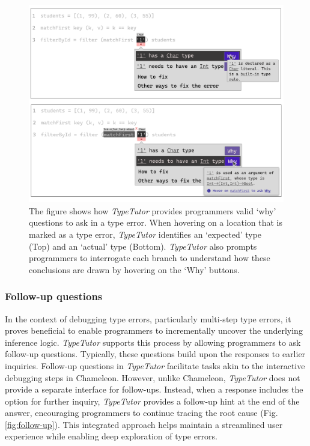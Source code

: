 \begin{figure}[hbt]
  \includegraphics[width=\linewidth]{Why}
  \caption{
      \label{fig:why}
      The figure shows how \textit{TypeTutor} provides programmers valid `why' questions to ask in a type error. When hovering on a location that is marked as a type error, \textit{TypeTutor} identifies an `expected' type (Top) and an `actual' type (Bottom). \textit{TypeTutor} also prompts programmers to interrogate each branch to understand how these conclusions are drawn by hovering on the `Why' buttons. 
    }
\end{figure}



\subsubsection{Follow-up questions}

In the context of debugging type errors, particularly multi-step type errors, it proves beneficial to enable programmers to incrementally uncover the underlying inference logic. \textit{TypeTutor} supports this process by allowing programmers to ask follow-up questions. Typically, these questions build upon the responses to earlier inquiries. Follow-up questions in \textit{TypeTutor} facilitate tasks akin to the interactive debugging steps in Chameleon. However, unlike Chameleon, \textit{TypeTutor} does not provide a separate interface for follow-ups. Instead, when a response includes the option for further inquiry, \textit{TypeTutor} provides a follow-up hint at the end of the answer, encouraging programmers to continue tracing the root cause (Fig. \ref{fig:follow-up}). This integrated approach helps maintain a streamlined user experience while enabling deep exploration of type errors.



